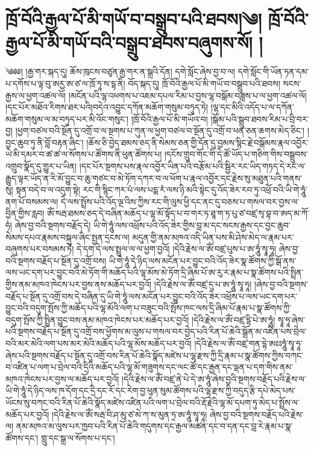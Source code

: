 \setcounter{footnote}{0} 
\chapter{ཁྲོ་བོའི་རྒྱལ་པོ་མི་གཡོ་བ་བསྒྲུབ་པའི་ཐབས།༄། ཁྲོ་བོའི་རྒྱལ་པོ་མི་གཡོ་བའི་བསྒྲུབ་ཐབས་བཞུགས་སོ། ། }༄༅༅། །རྒྱ་གར་སྐད་དུ། ཆོས་ཁུངས་བཙུན་རྒྱ་གར་ན་སྒྲའི་དོན། དགེ་སློང་ཞེས་བྱ་བ་ལ། དགེ་སློང་གི་ཡོན་ཏན་དམ་པ་དགོས་པ་ལྟ་བུ་ཨརྱ་ཨ་ཙ་ལ་ཁྲོ་ཏཱ་ས་དྷ་ནི། བོད་སྐད་དུ། ཁྲོ་བོའི་རྒྱལ་པོ་མི་གཡོ་བ་བསྒྲུབ་པའི་ཐབས། སངས་རྒྱས་ལ་ཕྱག་འཚལ་ལོ། །མངོན་པའི་ལྷ་འཕགས་པ་འཇམ་དཔལ་རིམ་པ་བྱས་ལྷ་བསྒོམ་བཟླས་པ་ལ་ཕྱག་འཚལ་ལོ། །དང་པོར་མཐོའ་རིགས་ཐར་པའི།བདེའ་འབྱུང་དཀོན་མཆོག་གསུམ་བཏུད་ཏེ། །ལྷ་དང་མིའི་འདོད་པ་ལ་དཀོན་མཆོག་གསུམ་ལ་མ་བཏུད་པར་མི་འོང་གསུང་། །ཁྲོ་བོའི་རྒྱལ་པོ་མི་གཡོའ་བ། །སྒོམ་པའི་སྒྲུབ་ཐབས་རིམ་པ་བྲི་བར་བྱ། །ཕྱག་བཙལ་བའི་སྔོན་དུ་འགྲོ་བ་ལ་སྔགས་པ་ཀུན་ལ་ཕྱག་བཙལ་བ་སྔོན་དུ་འགྲོ་བ་ཕན་ཅན་ཆགས་མེད་ཅིང་། །བྱང་ཆུབ་ཏུ་ནི་བློ་བརྟན་ཞིང་། །ཆོས་ཅི་བྱེད་ཐམས་ཅད་ནི་སེམས་ཅན་གྱི་དོན་དུ་བྱམས་སྙིང་རྗེ་བསྒོམས་རྣལ་འབྱོར་ཡེ་མི་དམར་བ་ཚ་ཚ་ལ་སོགས་པ་ཚོགས་ནི་ཕུན་ཚོགས་པ། །དངོས་གྲུབ་གོང་གི་དེ་ཚོ་ཡོད་པ་གཅིག་གིས་བསྒྲུབས་འགྲུབ་སྣོད་དུ་གྱུར་པ་ཡིན། །དང་པོར་སྔགས་པས་རྣལ་འབྱོར་ཡིན་པའི་བརྩོམ་པའི་སྦྱིར་རང་ཡིད་གཏད་དེ་རང་ལ་རྒྱུད་ལྟར་ཡོད་ན་རི་མོ་བྱུང་བ་ཆུ་གཙང་བ་མེ་ཏོག་དཀར་བ་ལ་ཕོག་པ་རྣལ་འབྱོར་དང་རྗེས་སུ་མཐུན་པའི་གནས་སུ། སྟན་བདེ་བ་ལ་འདུག་སྟེ། རང་གི་སྙིང་ཀར་པཾ་ལས་པདྨ་རཾ་ལས་ཉི་མའི་སྟེང་དུ་འོད་ཟེར་རབ་ཏུ་འཕྲོ་བའི་ཡི་གེ་ཧཱུཾ་ནག་པོ་བསམས་ལ། དེ་ལས་སྤྲོས་པའི་འོད་ལྔ་འིས་ཀྱིས་རང་གི་ལུས་ཕྱི་དང་ནང་དུ་བཅས་པ་གསལ་བར་བྱས་ལ་བྱིན་གྱིས་རླབ། ཨོཾ་སརྦ་ཐམས་ཅད་དེ་བཞིན་མཆོད་པ་ལྷ་མོ་སྟོད་པ་བ་གར་ཏ་ཐཱ་ག་ཏ་པུ་ཙ་བཛྲ་སྭ་བྷ་བ་ཨད་མ་ཀོ་ཧཾ། ཞེས་བྱ་བའི་སྔགས་བརྗོད་དེ། ཡི་གེ་ཧཱུཾ་ལས་འཕྲོས་པའི་འོད་ཟེར་གྱིས་བླ་མ་དང་སངས་རྒྱས་དང་བྱང་ཆུབ་སེམས་དཔའ་རྣམས་བསྐུལ་ཞིང་སྤྱན་དྲངས་ལ། མདུན་གྱི་ནམ་མཁའ་འདི་ཡིན་པས་མི་ཤེས་མེད་ལ་རྣམ་པར་བཞུགས་པར་བསམས་ཏེ། དེ་དག་དེ་ལས་སྤྲུལ་ལ་ལ་ཕྱག་བྱའོ། །དེའི་རྗེས་ལ་ཨོཾ་བཛྲ་པུས་པ་ཨ་ཧཱུཾ་སྭཱ་ཧཱ། ཞེས་བྱ་བའི་སྔགས་བརྗོད་པ་སྔོན་དུ་འགྲོ་བས། ཡི་གེ་ཧཱུཾ་དེ་ཉིད་ལས་མངོན་པར་བྱུང་བའི་འོད་ཟེར་སྣ་ཚོགས་ཀྱི་སྒོ་ནས་ལས་ཡང་དག་པར་བྱུང་བའི་མེ་ཏོག་གི་མཆོད་པའི་ལྷ་མོས་མེ་ཏོག་དྲི་ཞིམ་པོ་ཨ་རུ་ར་རྣམ་པ་སྣ་ཚོགས་པའི་སྤྲིན་གྱིས་ནམ་མཁའ་ཁེངས་པར་བྱས་ནས་མཆོད་པར་བྱའོ། །དེའི་རྗེས་ལ་ཨོཾ་བཛྲ་དུ་པ་ཨ་ཧཱུཾ་སྭཱ་ཧཱ། །ཞེས་བྱ་བའི་སྔགས་བརྗོད་པ་སྔོན་དུ་འགྲོ་བས་དེ་བཞིན་དུ་ཡི་གེ་ཧཱུཾ་ལས་མངོན་པར་བྱུང་བའི་འོད་ཟེར་འཕྲོས་པ་ལས་ཡང་དག་པར་བྱུང་བའི་བདུག་སྤོས་ཀྱི་མཆོད་པའི་ལྷ་མོའི་ལག་པ་བཟུང་བའི་སྤོས་ཁང་ལས་དྲི་ཞིམ་པོ་རྣམ་པ་སྣ་ཚོགས་ཀྱི་བདུག་སྤོས་ཀྱི་སྤྲིན་བྱུང་བས་ནམ་མཁའ་ཁེངས་པར་མཆོད་པར་བྱའོ། །དེའི་རྗེས་ལ་ཨོཾ་བཛྲ་དྷི་པེ་ཨ་ཧཱུཾ། སྭཱ་ཧཱ་ཞེས་པའི་སྔགས་བརྗོད་པ་སྔོན་དུ་འགྲོ་བས་ཕྱོགས་མ་ལུས་པ་གསལ་བར་བྱེད་པའི་རིན་པོ་ཆེའི་སྒྲོན་མ་འཛིན་པས་བྲེལ་བའི་མར་མེའི་ལག་པས་མར་མེའི་མཆོད་པའི་ལྷ་མོས་མཆོད་པར་བྱའོ། །དེའི་རྗེས་ལ་ཨོཾ་བཛྲ་གན་དྷེ་ཨཿཿཧཱུཾ་སྭཱ་ཧཱ་ཞེས་པའི་སྔགས་བརྗོད་པ་སྔོན་དུ་འགྲོ་བས་རིན་པོ་ཆེའི་སྣོད་མཛེས་པ་ལྷ་རྫས་ཀྱི་དྲི་རྣམ་པ་སྣ་ཚོགས་ཀྱིས་བཀང་བ་འཛིན་པ་ལག་པ་བྲེལ་བའི་དྲིའི་མཆོད་པའི་ལྷ་མོ་གཟུགས་དང་ལང་ཚོ་དང་རྒྱན་དང་ལྡན་པ་དག་གིས་ནམ་མཁའ་ཁེངས་པར་བྱས་ལ་མཆོད་པར་བྱའོ། །དེའི་རྗེས་ལ་ཨོཾ་བཛྲ་ནེ་པེ་དེ་ཨ་ཧཱུཾ་ཞེས་བྱའི་སྔགས་བརྗོད་པའི་རྗེས་ལ་ཡི་གེ་ཧཱུཾ་དེ་ཉིད་ལས་ཁ་དོག་དང་དྲི་དང་རོ་དང་རེག་བྱ་ཕུན་སུམ་ཚོགས་པའི་ལྷ་རྫས་ཀྱི་བདུད་རྩི་དཔེ་མེད་པས་ཡོངས་སུ་བཀང་བའི་རིན་པོ་ཆེའི་སྣོད་མཛེས་འཛིན་པའི་ལག་པ་བྲེལ་བའི་རྡོ་རྗེའི་ལྷ་མོ་དཔག་ཏུ་མེད་པ་སྤྲོས་ལ་མཆོད་པར་བྱའོ། །དེའི་རྗེས་ལ་ཨོཾ་སརྦ་བི་ཤ་མུ་ཙ་མེ་ཀ་ས་མུན་ཏྲ་ཨ་ཧཱུཾ་སྭཱ་ཧཱ། ཞེས་བྱ་བའི་སྔགས་བརྗོད་པའི་རྗེས་ལ། ནམ་མཁའ་མ་ལུས་པར་ཁྱབ་པའི་རིན་པོ་ཆེའི་གདུགས་དང་རྒྱལ་མཚན་དང་བ་དན་དང་བླ་རེ་རྣམ་པ་སྣ་ཚོགས་དང་། གླུ་དང་སྒྲ་ལ་སོགས་པ་དང་། 